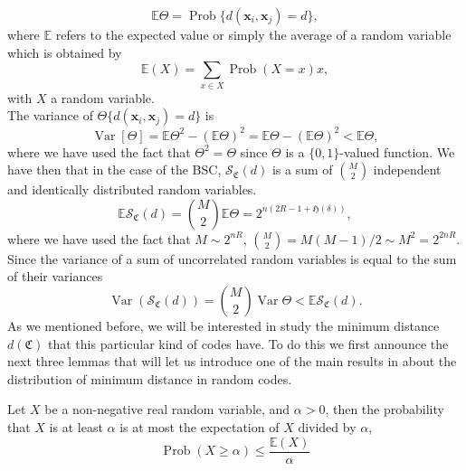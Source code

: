 \begin{equation}
\mathbb{E}\Theta = \operatorname{Prob}\{d(\mathbf{x}_i,\mathbf{x}_j) = d\},
\end{equation}
where $\mathbb{E}$ refers to the expected value or simply the average of a random variable which is obtained by
\begin{equation}
\mathbb{E}(X) = \sum_{x\in X} \operatorname{Prob}(X=x) x,
\end{equation}
with $X$ a random variable.\\
The variance of $\Theta\{d(\mathbf{x}_i,\mathbf{x}_j) = d\}$ is
\begin{equation}
\operatorname{Var}[\Theta] = \mathbb{E}\Theta^2 - (\mathbb{E}\Theta)^2 = \mathbb{E}\Theta - (\mathbb{E}\Theta)^2 <  \mathbb{E}\Theta,
\end{equation}
where we have used the fact that $\Theta^2 = \Theta$ since $\Theta$ is a $\{0,1\}$-valued function. We have then that in the case of the BSC, $\mathcal{S}_{\mathfrak{C}}(d)$ is a sum of ${M \choose 2}$ independent and identically distributed random variables.
\begin{equation}
\mathbb{E}\mathcal{S}_{\mathfrak{C}}(d) = {M\choose 2} \mathbb{E}\Theta = 2^{n(2R-1+\mathfrak{H}(\delta))},
\label{CH2:average_number_codes}
\end{equation}
where we have used the fact that $M \sim 2^{nR}$, ${M \choose 2}=M(M-1)/2\sim M^2=2^{2nR}$. Since the variance of a sum of uncorrelated random variables is equal to the sum of their variances
\begin{equation}
\operatorname{Var}(\mathcal{S}_{\mathfrak{C}}(d)) = {M \choose 2} \operatorname{Var}\Theta < \mathbb{E} \mathcal{S}_{\mathfrak{C}}(d).
\end{equation}
As we mentioned before, we will be interested in study the minimum distance $d(\mathfrak{C})$ that this particular kind of codes have. To do this we first announce the next three lemmas that will let us introduce one of the main results in \cite{barg_random_2002} about the distribution of minimum distance in random codes.


\begin{lemma}
Let $X$ be a non-negative real random variable, and $\alpha >0$, then the probability that $X$ is at least $\alpha$ is at most the expectation of $X$ divided by $\alpha$,
\begin{equation}
\operatorname{Prob}(X\geq \alpha)\leq \frac{\mathbb{E}(X)}{\alpha}
\end{equation}
\end{lemma}

